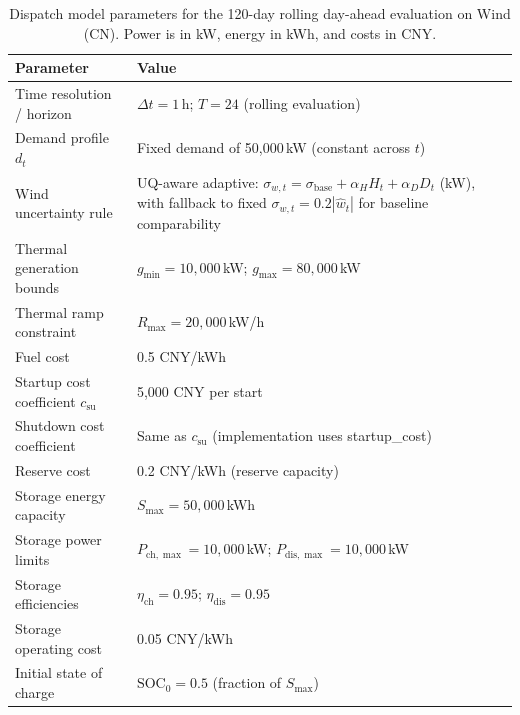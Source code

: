 ﻿\documentclass[review,1p,times]{elsarticle}
\begin{document}
\begin{table}[t]
\centering
\caption{Dispatch model parameters for the 120-day rolling day-ahead evaluation on Wind (CN). Power is in kW, energy in kWh, and costs in CNY.}
\label{tab:dispatch_params}
\begin{tabular}{ll}
\toprule
Parameter & Value \\
\midrule
Time resolution / horizon & $\Delta t=1$\,h; $T=24$ (rolling evaluation) \\
Demand profile $d_t$ & Fixed demand of 50{,}000\,kW (constant across $t$) \\
Wind uncertainty rule & UQ-aware adaptive: $\sigma_{w,t}=\sigma_{\mathrm{base}}+\alpha_H H_t + \alpha_D D_t$ (kW), with fallback to fixed $\sigma_{w,t}=0.2|\hat{w}_t|$ for baseline comparability \\
Thermal generation bounds & $g_{\min}=10{,}000$\,kW; $g_{\max}=80{,}000$\,kW \\
Thermal ramp constraint & $R_{\max}=20{,}000$\,kW/h \\
Fuel cost & 0.5 CNY/kWh \\
Startup cost coefficient $c_{\text{su}}$ & 5{,}000 CNY per start \\
Shutdown cost coefficient & Same as $c_{\text{su}}$ (implementation uses startup\_cost) \\
Reserve cost & 0.2 CNY/kWh (reserve capacity) \\
Storage energy capacity & $S_{\max}=50{,}000$\,kWh \\
Storage power limits & $P_{\text{ch},\max}=10{,}000$\,kW; $P_{\text{dis},\max}=10{,}000$\,kW \\
Storage efficiencies & $\eta_{\text{ch}}=0.95$; $\eta_{\text{dis}}=0.95$ \\
Storage operating cost & 0.05 CNY/kWh \\
Initial state of charge & $\text{SOC}_0=0.5$ (fraction of $S_{\max}$) \\
\bottomrule
\end{tabular}
\end{table}
\end{document}
